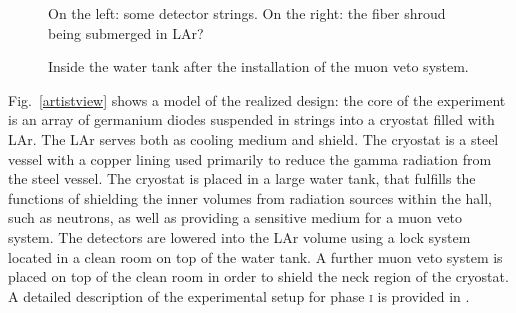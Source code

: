 \begin{figure}
	\centering
	\caption{On the left: some detector strings. On the right: the fiber shroud being submerged in LAr?}\label{fig:stringsfibers}
\end{figure}
\begin{figure}
	\centering
	\caption{Inside the water tank after the installation of the muon veto system.}\label{fig:muonveto}
\end{figure}

Fig.~\ref{artistview} shows a model of the realized design: the core of the experiment is an array of germanium diodes suspended in strings into a cryostat filled with LAr. The LAr serves both as cooling medium and shield. The cryostat is a steel vessel with a copper lining used primarily to reduce the gamma radiation from the steel vessel. The cryostat is placed in a large water tank, that fulfills the functions of shielding the inner volumes from radiation sources within the hall, such as neutrons, as well as providing a sensitive medium for a muon veto system. The detectors are lowered into the LAr volume using a lock system located in a clean room on top of the water tank. A further muon veto system is placed on top of the clean room in order to shield the neck region of the cryostat. A detailed description of the experimental setup for phase \textsc{i} is provided in \cite{gerdadescription}.

